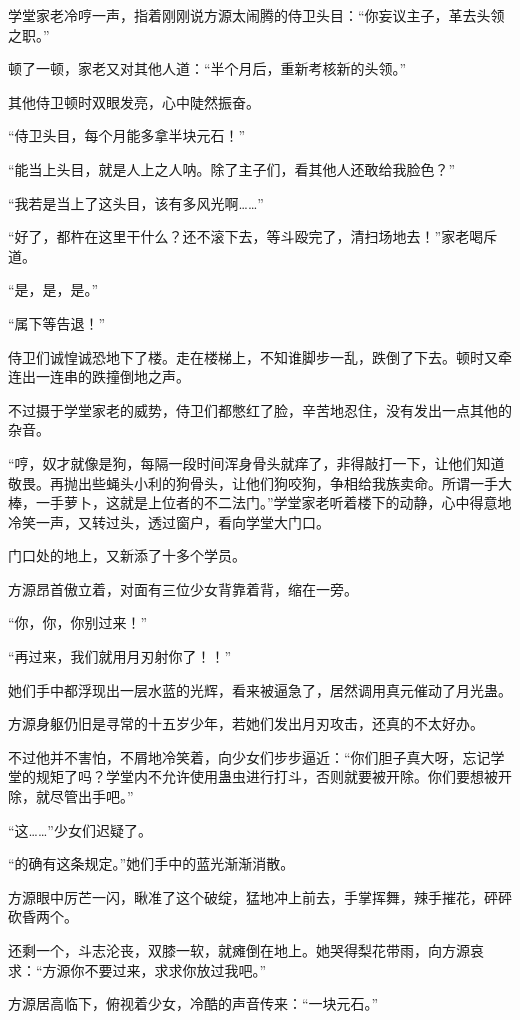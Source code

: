 \begin{this_body}
学堂家老冷哼一声，指着刚刚说方源太闹腾的侍卫头目：“你妄议主子，革去头领之职。”

顿了一顿，家老又对其他人道：“半个月后，重新考核新的头领。”

其他侍卫顿时双眼发亮，心中陡然振奋。

“侍卫头目，每个月能多拿半块元石！”

“能当上头目，就是人上之人呐。除了主子们，看其他人还敢给我脸色？”

“我若是当上了这头目，该有多风光啊……”

“好了，都杵在这里干什么？还不滚下去，等斗殴完了，清扫场地去！”家老喝斥道。

“是，是，是。”

“属下等告退！”

侍卫们诚惶诚恐地下了楼。走在楼梯上，不知谁脚步一乱，跌倒了下去。顿时又牵连出一连串的跌撞倒地之声。

不过摄于学堂家老的威势，侍卫们都憋红了脸，辛苦地忍住，没有发出一点其他的杂音。

“哼，奴才就像是狗，每隔一段时间浑身骨头就痒了，非得敲打一下，让他们知道敬畏。再抛出些蝇头小利的狗骨头，让他们狗咬狗，争相给我族卖命。所谓一手大棒，一手萝卜，这就是上位者的不二法门。”学堂家老听着楼下的动静，心中得意地冷笑一声，又转过头，透过窗户，看向学堂大门口。

门口处的地上，又新添了十多个学员。

方源昂首傲立着，对面有三位少女背靠着背，缩在一旁。

“你，你，你别过来！”

“再过来，我们就用月刃射你了！！”

她们手中都浮现出一层水蓝的光辉，看来被逼急了，居然调用真元催动了月光蛊。

方源身躯仍旧是寻常的十五岁少年，若她们发出月刃攻击，还真的不太好办。

不过他并不害怕，不屑地冷笑着，向少女们步步逼近：“你们胆子真大呀，忘记学堂的规矩了吗？学堂内不允许使用蛊虫进行打斗，否则就要被开除。你们要想被开除，就尽管出手吧。”

“这……”少女们迟疑了。

“的确有这条规定。”她们手中的蓝光渐渐消散。

方源眼中厉芒一闪，瞅准了这个破绽，猛地冲上前去，手掌挥舞，辣手摧花，砰砰砍昏两个。

还剩一个，斗志沦丧，双膝一软，就瘫倒在地上。她哭得梨花带雨，向方源哀求：“方源你不要过来，求求你放过我吧。”

方源居高临下，俯视着少女，冷酷的声音传来：“一块元石。”


\end{this_body}
